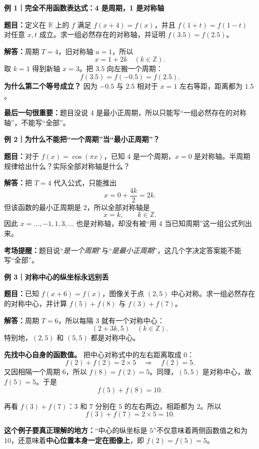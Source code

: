 \clearpage
\begin{examplebox}
\textbf{\textcolor{CExample}{例 1｜完全不用函数表达式：4 是周期，1 是对称轴}}



\textbf{题目：}定义在 $\mathbb R$ 上的 $f$ 满足 $f(x+4)=f(x)$，并且 $f(1+t)=f(1-t)$ 对任意 $x,t$ 成立。求一组必然存在的对称轴，并证明 $f(3.5)=f(2.5)$。

\textbf{解答：}周期 $T=4$，旧对称轴 $a=1$，所以
\[
\boxed{x=1+2k\quad(k\in\mathbb Z)}.
\]
取 $k=1$ 得到新轴 $x=3$。把 $3.5$ 向左搬一个周期：
\[
f(3.5)=f(-0.5)=f(2.5).
\]
\textbf{为什么第二个等号成立？} 因为 $-0.5$ 与 $2.5$ 相对于 $x=1$ 左右等距，距离都为 $1.5$。

\textbf{最后一句很重要：}题目没说 $4$ 是最小正周期，所以只能写“一组必然存在的对称轴”，不能写“全部”。

\medskip

\end{examplebox}
\clearpage
\begin{examplebox}
\textbf{\textcolor{CExample}{例 2｜为什么不能把“一个周期”当“最小正周期”？}}



\textbf{题目：}对于 $f(x)=\cos(\pi x)$，已知 $4$ 是一个周期，$x=0$ 是对称轴。半周期规律给出什么？实际全部对称轴是什么？

\textbf{解答：}把 $T=4$ 代入公式，只能推出
\[
x=0+\frac{4k}{2}=2k.
\]
但该函数的最小正周期是 $2$，所以全部对称轴是
\[
\boxed{x=k,\qquad k\in\mathbb Z.}
\]
因此 $x=\ldots,-1,1,3,\ldots$ 也是对称轴，却没有被“用 $4$ 当已知周期”这一组公式列出来。

\textbf{考场提醒：}题目说“\emph{是一个周期}”与“\emph{是最小正周期}”，这几个字决定答案能不能写“全部”。

\medskip

\end{examplebox}
\clearpage
\begin{examplebox}
\textbf{\textcolor{CExample}{例 3｜对称中心的纵坐标永远别丢}}



\textbf{题目：}已知 $f(x+6)=f(x)$，图像关于点 $(2,5)$ 中心对称。求一组必然存在的对称中心，并计算 $f(5)+f(8)$ 与 $f(3)+f(7)$。

\textbf{解答：}周期 $T=6$，所以每隔 $3$ 就有一个对称中心：
\[
\boxed{(2+3k,5)\quad(k\in\mathbb Z).}
\]
特别地，$(2,5)$ 和 $(5,5)$ 都是对称中心。

\textbf{先找中心自身的函数值。} 把中心对称式中的左右距离取成 $0$：
\[
f(2)+f(2)=2\times5\quad\Longrightarrow\quad f(2)=5.
\]
又因相隔一个周期 $6$，所以 $f(8)=f(2)=5$。同理，$(5,5)$ 是对称中心，故 $f(5)=5$。于是
\[
\boxed{f(5)+f(8)=10.}
\]

再看 $f(3)+f(7)$：$3$ 和 $7$ 分别在 $5$ 的左右两边，相距都为 $2$。所以
\[
\boxed{f(3)+f(7)=2\times5=10.}
\]

\textbf{这个例子要真正理解的地方：}“中心的纵坐标是 $5$”不仅意味着两侧函数值之和为 $10$，还意味着\textbf{中心位置本身一定在图像上}，即 $f(2)=f(5)=5$。

\medskip

\end{examplebox}
